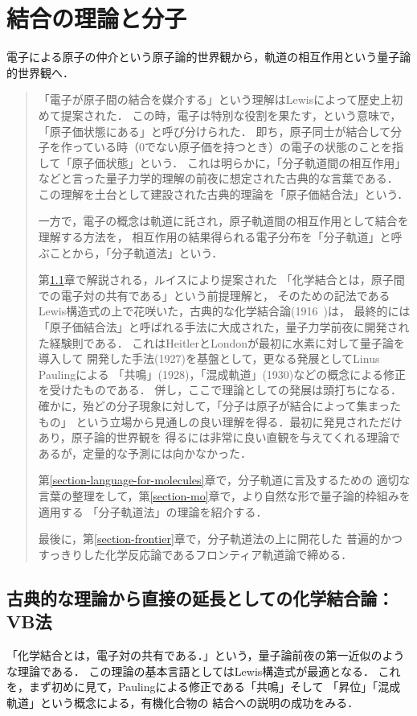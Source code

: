 \documentclass[uplatex, dvipdfmx]{jsreport}
\begin{document}
\chapter{結合の理論と分子}
電子による原子の仲介という原子論的世界観から，軌道の相互作用という量子論的世界観へ．

\begin{quotation}
「電子が原子間の結合を媒介する」という理解はLewisによって歴史上初めて提案された．
この時，電子は特別な役割を果たす，という意味で，「原子価状態にある」と呼び分けられた．
即ち，原子同士が結合して分子を作っている時（0でない原子価を持つとき）の電子の状態のことを指して「原子価状態」という．
これは明らかに，「分子軌道間の相互作用」などと言った量子力学的理解の前夜に想定された古典的な言葉である．
この理解を土台として建設された古典的理論を「原子価結合法」という．

一方で，電子の概念は軌道に託され，原子軌道間の相互作用として結合を理解する方法を，
相互作用の結果得られる電子分布を「分子軌道」と呼ぶことから，「分子軌道法」という．

第\ref{section-vb}章で解説される，ルイスにより提案された
「化学結合とは，原子間での電子対の共有である」という前提理解と，
そのための記法であるLewis構造式の上で花咲いた，古典的な化学結合論(1916~)は，
最終的には「原子価結合法」と呼ばれる手法に大成された，量子力学前夜に開発された経験則である．
これはHeitlerとLondonが最初に水素に対して量子論を導入して
開発した手法(1927)を基盤として，更なる発展としてLinus Paulingによる
「共鳴」(1928)，「混成軌道」(1930)などの概念による修正を受けたものである．
併し，ここで理論としての発展は頭打ちになる．
確かに，殆どの分子現象に対して，「分子は原子が結合によって集まったもの」
という立場から見通しの良い理解を得る．最初に発見されただけあり，原子論的世界観を
得るには非常に良い直観を与えてくれる理論であるが，定量的な予測には向かなかった．

第\ref{section-language-for-molecules}章で，分子軌道に言及するための
適切な言葉の整理をして，第\ref{section-mo}章で，より自然な形で量子論的枠組みを適用する
「分子軌道法」の理論を紹介する．

最後に，第\ref{section-frontier}章で，分子軌道法の上に開花した
普遍的かつすっきりした化学反応論であるフロンティア軌道論で締める．
\end{quotation}

\section{古典的な理論から直接の延長としての化学結合論：VB法}\label{section-vb}
「化学結合とは，電子対の共有である．」という，量子論前夜の第一近似のような理論である．
この理論の基本言語としてはLewis構造式が最適となる．
これを，まず初めに見て，Paulingによる修正である「共鳴」そして
「昇位」「混成軌道」という概念による，有機化合物の
結合への説明の成功をみる．
\end{document}

